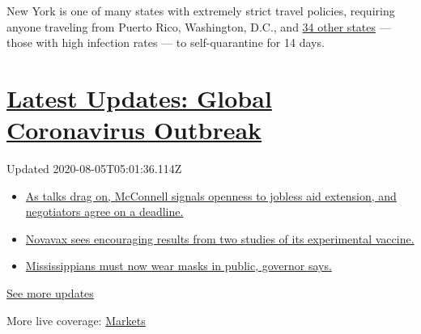 New York is one of many states with extremely strict travel policies,
requiring anyone traveling from Puerto Rico, Washington, D.C., and
\href{https://coronavirus.health.ny.gov/covid-19-travel-advisory}{34
other states} --- those with high infection rates --- to self-quarantine
for 14 days.

\hypertarget{latest-updates-global-coronavirus-outbreak}{%
\section{\texorpdfstring{\href{https://www.nytimes.com/2020/08/04/world/coronavirus-cases.html?action=click\&pgtype=Article\&state=default\&region=MAIN_CONTENT_1\&context=storylines_live_updates}{Latest
Updates: Global Coronavirus
Outbreak}}{Latest Updates: Global Coronavirus Outbreak}}\label{latest-updates-global-coronavirus-outbreak}}

Updated 2020-08-05T05:01:36.114Z

\begin{itemize}
\tightlist
\item
  \href{https://www.nytimes.com/2020/08/04/world/coronavirus-cases.html?action=click\&pgtype=Article\&state=default\&region=MAIN_CONTENT_1\&context=storylines_live_updates\#link-762df92}{As
  talks drag on, McConnell signals openness to jobless aid extension,
  and negotiators agree on a deadline.}
\item
  \href{https://www.nytimes.com/2020/08/04/world/coronavirus-cases.html?action=click\&pgtype=Article\&state=default\&region=MAIN_CONTENT_1\&context=storylines_live_updates\#link-1228a480}{Novavax
  sees encouraging results from two studies of its experimental
  vaccine.}
\item
  \href{https://www.nytimes.com/2020/08/04/world/coronavirus-cases.html?action=click\&pgtype=Article\&state=default\&region=MAIN_CONTENT_1\&context=storylines_live_updates\#link-794484ed}{Mississippians
  must now wear masks in public, governor says.}
\end{itemize}

\href{https://www.nytimes.com/2020/08/04/world/coronavirus-cases.html?action=click\&pgtype=Article\&state=default\&region=MAIN_CONTENT_1\&context=storylines_live_updates}{See
more updates}

More live coverage:
\href{https://www.nytimes.com/live/2020/08/04/business/stock-market-today-coronavirus?action=click\&pgtype=Article\&state=default\&region=MAIN_CONTENT_1\&context=storylines_live_updates}{Markets}

